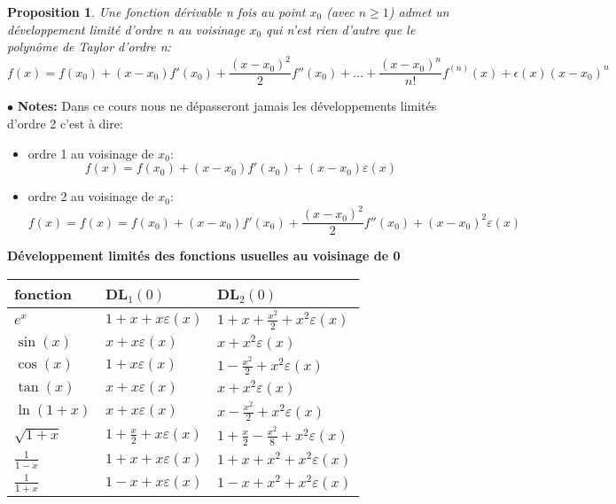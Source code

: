 \documentclass[a4paper]{article}
\theoremstyle{break}
\newtheorem{prop}{Proposition}[section]
\newcommand{\note}{$\bullet$ \textbf{Notes: }}
\begin{document}
\begin{prop}
  Une fonction dérivable n fois au point $x_0$ (avec $n \geq 1$) admet
  un développement limité d'ordre n au voisinage $x_0$ qui n'est rien
  d'autre que le polynôme de Taylor d'ordre n:
  \[
    f(x) = f(x_0) + (x-x_0)f'(x_0) + \frac{(x-x_0)^2}{2} f''(x_0) +
    \dots + \frac{(x-x_0)^n}{n!} f^{(n)}(x) + \epsilon(x)(x-x_0)^n
  \]
\end{prop}

\note Dans ce cours nous ne dépasseront jamais les développements
limités d'ordre 2 c'est à dire:
\begin{itemize}[label=$\bullet$, leftmargin=2cm]
\item ordre 1 au voisinage de $x_0$:
  \[
    f(x) = f(x_0) + (x-x_0)f'(x_0) + (x-x_0) \varepsilon(x)
  \]
\item ordre 2 au voisinage de $x_0$:
  \[
    f(x) = f(x) = f(x_0) + (x-x_0)f'(x_0) + \frac{(x-x_0)^2}{2} f''(x_0)
    + (x-x_0)^2 \varepsilon(x)
  \]
\end{itemize}

\textbf{Développement limités des fonctions usuelles au voisinage de
  0}
\begin{center}
  \renewcommand{\arraystretch}{1.5} %
  \begin{tabular}{|l|C{5cm}|C{5cm}|}
    \hline
    fonction & DL$_1(0)$ & DL$_2(0)$\\
    \hline
    $e^x$ & $1 + x + x \varepsilon(x)$
          & $1 + x + \frac{x^2}{2} + x^2 \varepsilon(x)$ \\
    \hline
    $\sin(x)$ & $x + x \varepsilon(x)$
              & $x + x^2 \varepsilon(x)$ \\
    \hline
    $\cos(x)$ & $1 + x\varepsilon(x)$
              & $1 - \frac{x^2}{2} + x^2 \varepsilon(x)$ \\
    \hline
    $\tan(x)$ & $x + x \varepsilon(x)$
              & $x + x^2 \varepsilon(x)$ \\
    \hline
    $\ln(1+x)$ & $x + x \varepsilon(x)$
               & $x - \frac{x^2}{2} + x^2 \varepsilon(x)$ \\
    \hline
    $\sqrt{1+x}$ & $1 + \frac{x}{2} + x \varepsilon(x)$
                 & $1 + \frac{x}{2} - \frac{x^2}{8}+ x^2
                   \varepsilon(x)$ \\
    \hline
    $\frac{1}{1-x}$ & $1 + x + x \varepsilon(x)$
                    & $1 + x + x^2 + x^2 \varepsilon(x)$  \\
    \hline
    $\frac{1}{1+x}$ & $1 - x + x \varepsilon(x)$
                    & $1 - x + x^2 + x^2 \varepsilon(x)$\\
    \hline
  \end{tabular}
\end{center}
\end{document}
